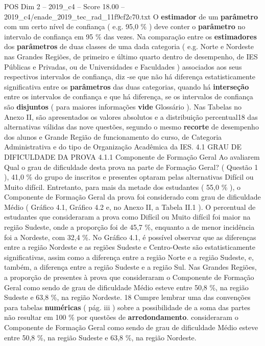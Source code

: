 \begin{textsample}{POS Dim 2 – 2019\_c4 – Score 18.00 – 2019\_c4/enade\_2019\_tec\_rad\_11f9cf2c70.txt}
O \textbf{estimador} de um \textbf{parâmetro} com um certo nível de confiança ( e.g. 95,0 \% ) deve conter o \textbf{parâmetro} no intervalo de confiança em 95 \% das vezes.
Na comparação entre os \textbf{estimadores} dos \textbf{parâmetros} de duas classes de uma dada categoria ( e.g.
Norte e Nordeste nas Grandes Regiões, de primeiro e último quarto dentro de desempenho, de IES Públicas e Privadas, ou de Universidades e Faculdades ) associados aos seus respectivos intervalos de confiança, diz -se que não há diferença estatisticamente significativa entre os \textbf{parâmetros} das duas categorias, quando há \textbf{interseção} entre os intervalos de confiança e que há diferença, se os intervalos de confiança são \textbf{disjuntos} ( para maiores informações \textbf{vide} Glossário ).
Nas Tabelas no Anexo II, são apresentados os valores absolutos e a distribuição percentual18 das alternativas válidas das nove questões, segundo o mesmo \textbf{recorte} de desempenho dos alunos e Grande Região de funcionamento do curso, de Categoria Administrativa e do tipo de Organização Acadêmica da IES. 4.1 GRAU DE DIFICULDADE DA PROVA 4.1.1 Componente de Formação Geral Ao avaliarem Qual o grau de dificuldade desta prova na parte de Formação Geral? ( Questão 1 ), 41,0 \% do grupo de inscritos e presentes optaram pelas alternativas Difícil ou Muito difícil.
Entretanto, para mais da metade dos estudantes ( 55,0 \% ), o Componente de Formação Geral da prova foi considerado com grau de dificuldade Médio ( Gráfico 4.1, Gráfico 4.2 e, no Anexo II, a Tabela II.1 ).
O percentual de estudantes que consideraram a prova como Difícil ou Muito difícil foi maior na região Sudeste, onde a proporção foi de 45,7 \%, enquanto a de menor incidência foi a Nordeste, com 32,4 \%.
No Gráfico 4.1, é possível observar que as diferenças entre a região Nordeste e as regiões Sudeste e Centro-Oeste são estatisticamente significativas, assim como a diferença entre a região Norte e a região Sudeste, e, também, a diferença entre a região Sudeste e a região Sul.
Nas Grandes Regiões, a proporção de presentes à prova que consideraram o Componente de Formação Geral como sendo de grau de dificuldade Médio esteve entre 50,8 \%, na região Sudeste e 63,8 \%, na região Nordeste. 18 Cumpre lembrar uma das convenções para tabelas \textbf{numéricas} ( pág. iii ) sobre a possibilidade de a soma das partes não resultar em 100 \% por questões de \textbf{arredondamento}. consideraram o Componente de Formação Geral como sendo de grau de dificuldade Médio esteve entre 50,8 \%, na região Sudeste e 63,8 \%, na região Nordeste.

\end{textsample}
